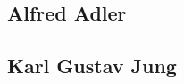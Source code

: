 \documentclass{subfiles}
\begin{document}
\subsection{Alfred Adler}


\subsection{Karl Gustav Jung}


\clearpage
\end{document}
